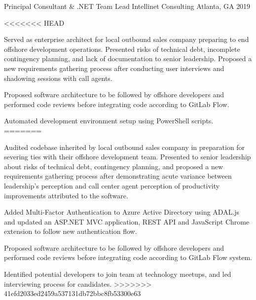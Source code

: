 \begin{cventries}
  \cventry
    {Principal Consultant \& .NET Team Lead} %
    {Intellinet Consulting} %
    {Atlanta, GA} %
    {2019} %
    {
      \begin{cvitems} %
<<<<<<< HEAD
        \item {Served as enterprise architect for local outbound sales company preparing to end offshore development operations. Presented risks of technical debt, incomplete contingency planning, and lack of documentation to senior leadership. Proposed a new requirements gathering process after conducting user interviews and shadowing sessions with call agents.}
        \item {Proposed software architecture to be followed by offshore developers and performed code reviews before integrating code according to GitLab Flow.}
        \item {Automated development environment setup using PowerShell scripts.}
=======
        \item {Audited codebase inherited by local outbound sales company in preparation for severing ties with their offshore development team. Presented to senior leadership about risks of technical debt, contingency planning, and proposed a new requirements gathering process after demonstrating acute variance between leadership’s perception and call center agent perception of productivity improvements attributed to the software.}
        \item {Added Multi-Factor Authentication to Azure Active Directory using ADAL.js and updated an ASP.NET MVC application, REST API and JavaScript Chrome extension to follow new authentication flow.}
        \item {Proposed software architecture to be followed by offshore developers and performed code reviews before integrating code according to GitLab Flow system.}
        \item {Identified potential developers to join team at technology meetups, and led interviewing process for candidates.}
>>>>>>> 41efd2033ed2459a537131db72bbc8fb53300e63
      \end{cvitems}
    }


\end{cventries}
